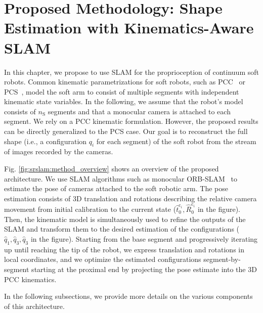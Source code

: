 \section{Proposed Methodology: Shape Estimation with Kinematics-Aware SLAM}
\label{sec:srslam:pose_estimation}

In this chapter, we propose to use \gls{SLAM} for the proprioception of continuum soft robots. Common kinematic parametrizations for soft robots, such as \gls{PCC}~\citep{webster2010design} or \gls{PCS}~\citep{renda2018discrete}, model the soft arm to consist of multiple segments with independent kinematic state variables. 
In the following, we assume that the robot's model consists of $n_{\mathrm{S}}$ segments and that a monocular camera is attached to each segment. We rely on a \gls{PCC} kinematic formulation. However, the proposed results can be directly generalized to the PCS case.
%
%
Our goal is to reconstruct the full shape (i.e., a configuration $q_i$ for each segment) of the soft robot from the stream of images recorded by the cameras.

Fig. \ref{fig:srslam:method_overview} shows an overview of the proposed architecture.
%
We use \gls{SLAM} algorithms such as monocular ORB-SLAM~\citep{mur2017orb} to estimate the pose of cameras attached to the soft robotic arm.  The pose estimation consists of 3D translation and rotations describing the relative camera movement from initial calibration to the current state ($\hat{t}_0^{\mathrm{c}_i},\hat{R}_0^{\mathrm{c}_i}$ in the figure). Then, the kinematic model is simultaneously used to refine the outputs of the SLAM and transform them to the desired estimation of the configurations ($\hat{q}_1,\hat{q}_3,\hat{q}_3$ in the figure). Starting from the base segment and progressively iterating up until reaching the tip of the robot, we express translation and rotations in local coordinates, and we optimize the estimated configurations segment-by-segment starting at the proximal end by projecting the pose estimate into the 3D \gls{PCC} kinematics.

In the following subsections, we provide more details on the various components of this architecture.

